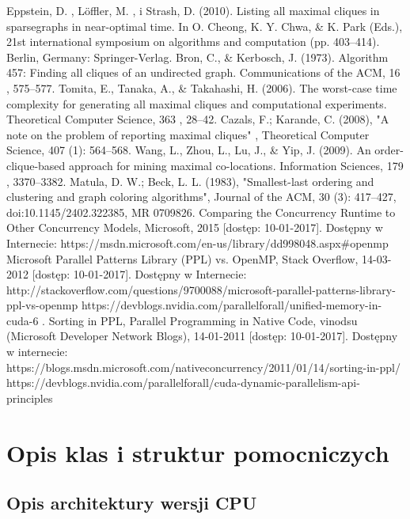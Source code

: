 \documentclass[12pt]{article}
\begin{document}
\begin{thebibliography}{}
Eppstein, D. , Löffler, M. , i Strash, D. (2010). Listing all maximal cliques in sparsegraphs in near-optimal time. In O. Cheong, K. Y. Chwa, \& K. Park (Eds.), 21st international symposium on algorithms and computation (pp. 403–414). Berlin, Germany: Springer-Verlag.
Bron, C., \& Kerbosch, J. (1973). Algorithm 457: Finding all cliques of an undirected graph. Communications of the ACM, 16 , 575–577.
Tomita, E., Tanaka, A., \& Takahashi, H. (2006). The worst-case time complexity for
generating all maximal cliques and computational experiments. Theoretical Computer Science, 363 , 28–42.
Cazals, F.; Karande, C. (2008), "A note on the problem of reporting maximal cliques" , Theoretical Computer Science, 407 (1): 564–568.
Wang, L., Zhou, L., Lu, J., \& Yip, J. (2009). An order-clique-based approach for mining maximal co-locations. Information Sciences, 179 , 3370–3382.
Matula, D. W.; Beck, L. L. (1983), "Smallest-last ordering and clustering and graph coloring algorithms", Journal of the ACM, 30 (3): 417–427, doi:10.1145/2402.322385, MR 0709826.
Comparing the Concurrency Runtime to Other Concurrency Models, Microsoft, 2015 [dostęp: 10-01-2017]. Dostępny w Internecie: https://msdn.microsoft.com/en-us/library/dd998048.aspx\#openmp
Microsoft Parallel Patterns Library (PPL) vs. OpenMP, Stack Overflow, 14-03-2012 [dostęp: 10-01-2017]. Dostępny w Internecie: http://stackoverflow.com/questions/9700088/microsoft-parallel-patterns-library-ppl-vs-openmp
https://devblogs.nvidia.com/parallelforall/unified-memory-in-cuda-6
. Sorting in PPL, Parallel Programming in Native Code, vinodsu (Microsoft Developer Network Blogs), 14-01-2011 [dostęp: 10-01-2017]. Dostępny w internecie: https://blogs.msdn.microsoft.com/nativeconcurrency/2011/01/14/sorting-in-ppl/
https://devblogs.nvidia.com/parallelforall/cuda-dynamic-parallelism-api-principles

\end{thebibliography}
\newpage

\appendix

\section{Opis klas i struktur pomocniczych}
\label{sec:wypociny}

\subsection{Opis architektury wersji CPU}
\end{document}
